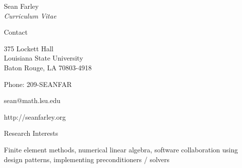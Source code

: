 \documentclass[10pt]{article}
\begin{document}


\newlength{\oldcvlabelwidth}
\renewcommand*{\cvbibname}{}
\newcommand{\name}{Sean Farley}
\newcommand{\institute}{Louisiana State University}
\newcommand{\dept}{Department of Mathematics}

\begin{cv}{\name\\{\large \itshape Curriculum Vitae}}

\begin{cvlist}{Contact}
	\item
	375 Lockett Hall\\
	\institute\\
	Baton Rouge, LA 70803-4918
	\item Phone: 209-SEANFAR
	\item sean@math.lsu.edu
	\item http://seanfarley.org
\end{cvlist}

\begin{cvlist}{Research Interests}
	\item Finite element methods, numerical linear algebra, software collaboration using design patterns, implementing preconditioners / solvers
\end{cvlist}


\end{cv}
\end{document}
